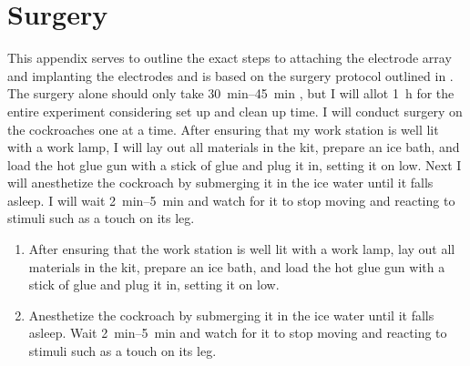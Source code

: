 \section{Surgery}
\label{app:A}

This appendix serves to outline the exact steps to attaching the electrode array and implanting the electrodes and is based on the surgery protocol outlined in \citep{backyardbrains2020roboroach}. The surgery alone should only take \SIrange{30}{45}{\minute} , but I will allot \SI{1}{\hour} for the entire experiment considering set up and clean up time. I will conduct surgery on the cockroaches one at a time. After ensuring that my work station is well lit with a work lamp, I will lay out all materials in the kit, prepare an ice bath, and load the hot glue gun with a stick of glue and plug it in, setting it on low. Next I will anesthetize the cockroach by submerging it in the ice water until it falls asleep. I will wait \SIrange{2}{5}{\minute} and watch for it to stop moving and reacting to stimuli such as a touch on its leg.




\begin{enumerate}
\item After ensuring that the work station is well lit with a work lamp, lay out all materials in the kit, prepare an ice bath, and load the hot glue gun with a stick of glue and plug it in, setting it on low.
\item Anesthetize the cockroach by submerging it in the ice water until it falls asleep.
    \subitem Wait \SIrange{2}{5}{\minute} and watch for it to stop moving and reacting to stimuli such as a touch on its leg.
\end{enumerate}







